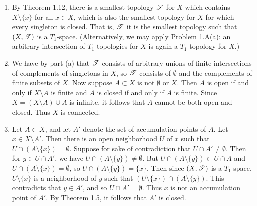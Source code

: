 \begin{prob}
\begin{enumerate}
\item By Theorem 1.12, there is a smallest topology $\mathscr{T}$ for $X$ which contains $X\setminus\{x\}$ for all $x \in X$, which is also the smallest topology for $X$ for which every singleton is closed. That is, $\mathscr{T}$ it is the smallest topology such that $(X, \mathscr{T})$ is a $T_1$-space. (Alternatively, we may apply Problem 1.A(a): an arbitrary intersection of $T_1$-topologies for $X$ is again a $T_1$-topology for $X$.)

\item We have by part (a) that $\mathscr{T}$ consists of arbitrary unions of finite intersections of complements of singletons in $X$, so $\mathscr{T}$ consists of $\emptyset$ and the complements of finite subsets of $X$. Now suppose $A \subset X$ is not $\emptyset$ or $X$. Then $A$ is open if and only if $X\setminus A$ is finite and $A$ is closed if and only if $A$ is finite. Since $X = (X\setminus A) \cup A$ is infinite, it follows that $A$ cannot be both open and closed. Thus $X$ is connected.

\item Let $A \subset X$, and let $A'$ denote the set of accumulation points of $A$. Let $x \in X\setminus A'$. Then there is an open neighborhood $U$ of $x$ such that $U\cap (A\setminus\{x\}) = \emptyset$. Suppose for sake of contradiction that $U\cap A' \not = \emptyset$. Then for $y \in U\cap A'$, we have $U\cap (A\setminus\{y\}) \not = \emptyset$. But $U\cap (A\setminus\{y\}) \subset U\cap A$ and $U\cap (A\setminus\{x\}) = \emptyset$, so $U\cap(A\setminus\{y\}) = \{x\}$. Then since $(X, \mathscr{T})$ is a $T_1$-space, $U\setminus\{x\}$ is a neighborhood of $y$ such that $(U\setminus\{x\})\cap (A\setminus\{y\})$. This contradicts that $y \in A'$, and so $U\cap A' = \emptyset$. Thus $x$ is not an accumulation point of $A'$. By Theorem 1.5, it follows that $A'$ is closed.
\end{enumerate}
\end{prob}

\begin{prob}

\end{prob}

